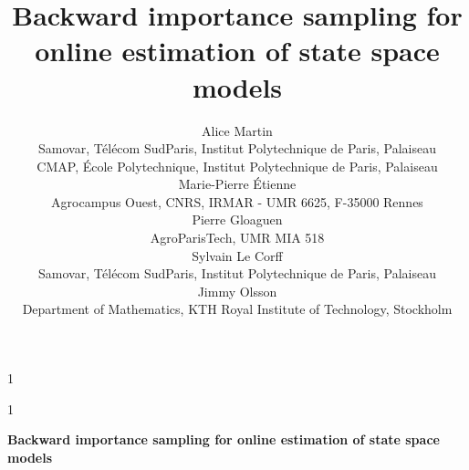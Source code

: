 \documentclass[12pt]{article}
\newcommand{\blind}{1}
\begin{document}
%

\def\spacingset#1{\renewcommand{\baselinestretch}%
{#1}\small\normalsize} \spacingset{1}



\blind
{
  \title{\bf Backward importance sampling for online estimation of state space models}
  \author{Alice Martin\\
     Samovar, T\'el\'ecom SudParis, Institut Polytechnique de Paris, Palaiseau\\
    CMAP, \'Ecole Polytechnique, Institut Polytechnique de Paris, Palaiseau\\
    Marie-Pierre \'Etienne \\
    Agrocampus Ouest, CNRS, IRMAR - UMR 6625, F-35000 Rennes\\ 
Pierre Gloaguen\\
AgroParisTech, UMR MIA 518\\
Sylvain Le Corff\\
Samovar, T\'el\'ecom SudParis, Institut Polytechnique de Paris, Palaiseau\\
Jimmy Olsson\\
Department of Mathematics, KTH Royal Institute of Technology, Stockholm
}
  \maketitle
} \fi

\blind
{
  \bigskip
  \bigskip
  \bigskip
  \begin{center}
    {\LARGE\bf Backward importance sampling for online estimation of state space models}
\end{center}
  \medskip
} \fi
\end{document}
